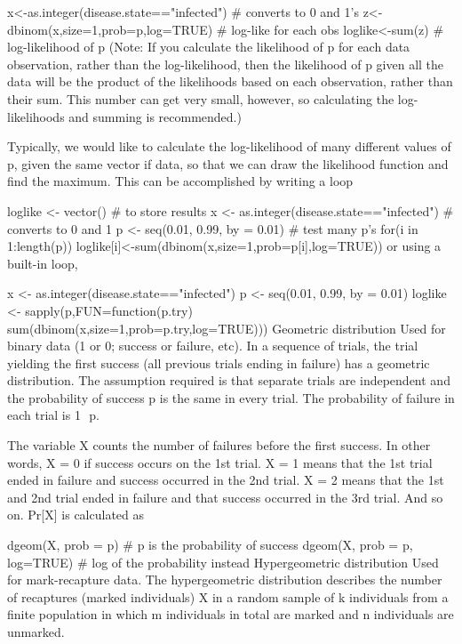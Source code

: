 x<-as.integer(disease.state=="infected") # converts to 0 and 1's
z<-dbinom(x,size=1,prob=p,log=TRUE)      # log-like for each obs
loglike<-sum(z)                          # log-likelihood of p
(Note: If you calculate the likelihood of p for each data observation, rather than the log-likelihood, then the likelihood of p given all the data will be the product of the likelihoods based on each observation, rather than their sum. This number can get very small, however, so calculating the log-likelihoods and summing is recommended.)

Typically, we would like to calculate the log-likelihood of many different values of p, given the same vector if data, so that we can draw the likelihood function and find the maximum. This can be accomplished by writing a loop

loglike <- vector()                        # to store results
x <- as.integer(disease.state=="infected") # converts to 0 and 1
p <- seq(0.01, 0.99, by = 0.01)            # test many p's
for(i in 1:length(p)){
  loglike[i]<-sum(dbinom(x,size=1,prob=p[i],log=TRUE))
  }
or using a built-in loop,

x <- as.integer(disease.state=="infected")
p <- seq(0.01, 0.99, by = 0.01)
loglike <- sapply(p,FUN=function(p.try){
  sum(dbinom(x,size=1,prob=p.try,log=TRUE))})
Geometric distribution
Used for binary data (1 or 0; success or failure, etc). In a sequence of trials, the trial yielding the first success (all previous trials ending in failure) has a geometric distribution. The assumption required is that separate trials are independent and the probability of success p is the same in every trial. The probability of failure in each trial is 1  p.

The variable X counts the number of failures before the first success. In other words, X = 0 if success occurs on the 1st trial. X = 1 means that the 1st trial ended in failure and success occurred in the 2nd trial. X = 2 means that the 1st and 2nd trial ended in failure and that success occurred in the 3rd trial. And so on. Pr[X] is calculated as

dgeom(X, prob = p)            # p is the probability of success
dgeom(X, prob = p, log=TRUE)  # log of the probability instead
Hypergeometric distribution
Used for mark-recapture data. The hypergeometric distribution describes the number of recaptures (marked individuals) X in a random sample of k individuals from a finite population in which m individuals in total are marked and n individuals are unmarked.

